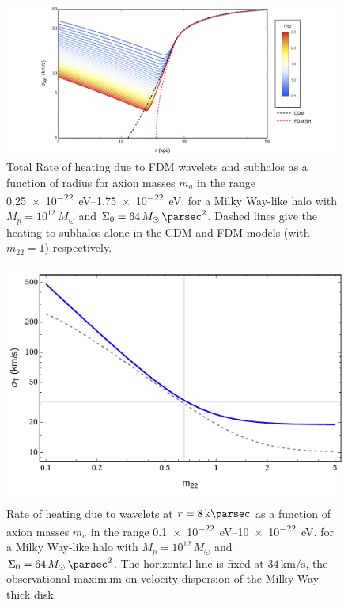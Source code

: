 \documentclass[usenatbib]{mnras}
\begin{document}
\begin{figure}
\includegraphics[width=17cm]{FDM_velocity}
\caption{Total Rate of heating due to FDM wavelets and subhalos as a function of radius for axion masses $m_{a}$ in the range \SIrange{0.25 e-22}{ 1.75 e-22}{\electronvolt}. for a Milky Way-like halo with $M_p = 10^{12} \, M_\odot$ and $\Sigma_0 = 64 \, M_\odot \, \si{\per\parsec^2}$. Dashed lines give the heating to subhalos alone in the CDM and FDM models (with $m_{22} = 1$) respectively.}
\label{fig:radiusheating}
\end{figure}

\begin{figure}
\includegraphics[width=\columnwidth]{FDM_mass_dep}
\vspace*{-5mm}
\caption{Rate of heating due to wavelets at $r = 8\, \si{\kilo \parsec}$ as a function of axion masses $m_{a}$ in the range \SIrange{0.1 e-22}{ 10 e-22}{\electronvolt}. for a Milky Way-like halo with $M_p = 10^{12} \, M_\odot$ and $\Sigma_0 = 64 \, M_\odot \, \si{\per\parsec^2}$. The horizontal line is fixed at $34\, \si{\kilo\meter\per\second}$, the observational maximum on velocity dispersion of the Milky Way thick disk. }
\label{fig:mass_dep_heating}
\end{figure}
\end{document}
